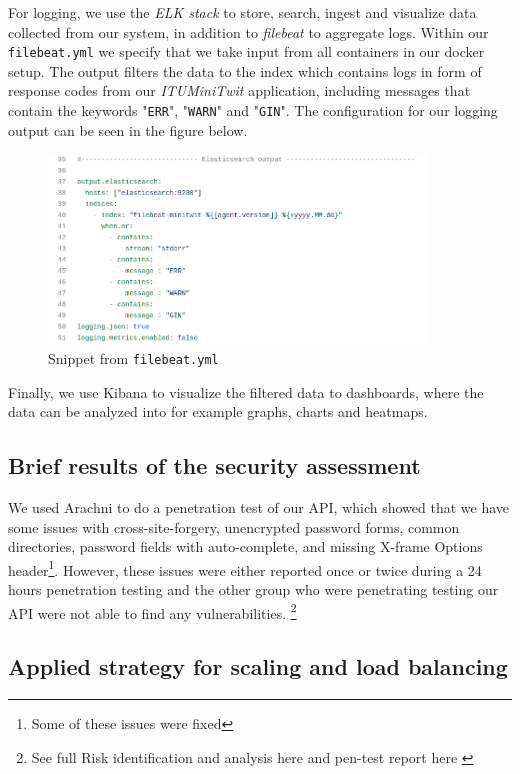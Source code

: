 For logging, we use the \textit{ELK stack} to store, search, ingest and visualize data collected from our system, in addition to \textit{filebeat} to aggregate logs. Within our \texttt{filebeat.yml} we specify that we take input from all containers in our docker setup. The output filters the data to the index which contains logs in form of response codes from our \textit{ITUMiniTwit} application, including messages that contain the keywords "\texttt{ERR}", "\texttt{WARN}" and "\texttt{GIN}". The configuration for our logging output can be seen in the figure below.
\begin{figure}[ht]
    \centering
    \includegraphics[width=0.9\textwidth]{images/filebeat-snippet.png}
    \caption{Snippet from \texttt{filebeat.yml}}
    \label{fig:filebeat}
\end{figure}

Finally, we use Kibana to visualize the filtered data to dashboards, where the data can be analyzed into for example graphs, charts and heatmaps.

\subsection{Brief results of the security assessment}
We used Arachni to  do a penetration test of our API, which showed that we have some issues with cross-site-forgery, unencrypted password forms, common directories, password fields with auto-complete, and missing X-frame Options header\footnote{Some of these issues were fixed}. However, these issues were either reported once or twice during a 24 hours penetration testing and the other group who were penetrating testing our API were not able to find any vulnerabilities.  \footnote{See full Risk identification and analysis here \cite{security} and pen-test report here \cite{pen-test}}


\subsection{Applied strategy for scaling and load balancing}

